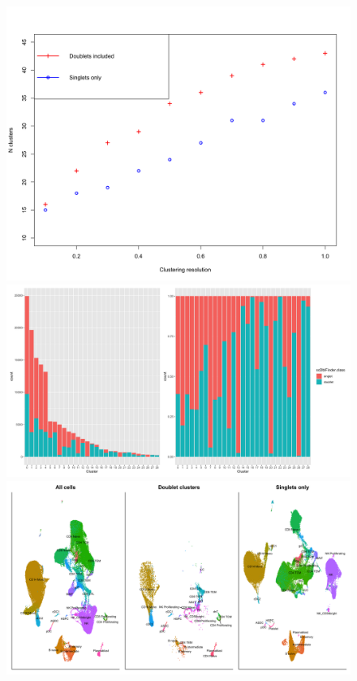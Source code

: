 \documentclass[unnumsec,webpdf,modern,large]{oup-authoring-template}
\begin{document}
	\begin{figure}
		\begin{center}
			\includegraphics[scale=0.05]{figures/cluster_counts.png} 
			\includegraphics[scale=0.05]{figures/doublet_clusters.png} \\
			\includegraphics[scale=0.05]{figures/umap_before_after.png}

\end{center}
\end{figure}
\end{document}
